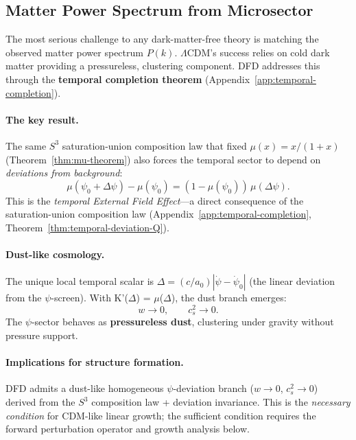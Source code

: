 \subsection{Matter Power Spectrum from Microsector}\label{sec:Pk-cosmology}

The most serious challenge to any dark-matter-free theory is matching the observed matter power spectrum $P(k)$. $\Lambda$CDM's success relies on cold dark matter providing a pressureless, clustering component. DFD addresses this through the \textbf{temporal completion theorem} (Appendix~\ref{app:temporal-completion}).

\paragraph{The key result.}
The same $S^3$ saturation-union composition law that fixed $\mu(x) = x/(1+x)$ (Theorem~\ref{thm:mu-theorem}) also forces the temporal sector to depend on \textit{deviations from background}:
\begin{equation}
\mu(\psi_0 + \Delta\psi) - \mu(\psi_0) = (1 - \mu(\psi_0))\,\mu(\Delta\psi).
\label{eq:temporal-EFE-main}
\end{equation}
This is the \textit{temporal External Field Effect}---a direct consequence of the saturation-union composition law (Appendix~\ref{app:temporal-completion}, Theorem~\ref{thm:temporal-deviation-Q}).

\paragraph{Dust-like cosmology.}
The unique local temporal scalar is $\Delta = (c/a_0)|\dot\psi - \dot\psi_0|$ (the linear deviation from the $\psi$-screen). With K'($\Delta$) = $\mu$($\Delta$), the dust branch emerges:
\begin{equation}
w \to 0, \qquad c_s^2 \to 0.
\end{equation}
The $\psi$-sector behaves as \textbf{pressureless dust}, clustering under gravity without pressure support.

\paragraph{Implications for structure formation.}
DFD admits a dust-like homogeneous $\psi$-deviation branch ($w \to 0$, $c_s^2 \to 0$) derived from the $S^3$ composition law + deviation invariance. This is the \emph{necessary condition} for CDM-like linear growth; the sufficient condition requires the forward perturbation operator and growth analysis below.

